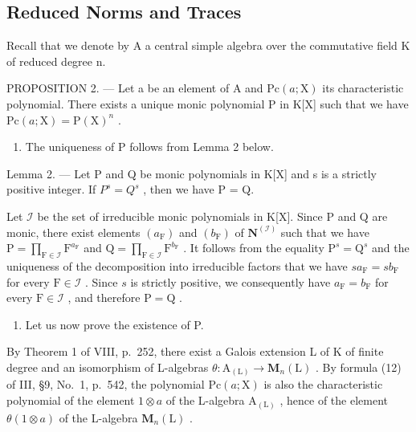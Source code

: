 \subsection{Reduced Norms and Traces}

Recall that we denote by A a central simple algebra over the commutative field K of reduced degree n.

PROPOSITION 2. --- Let a be an element of A and \(\mathrm{Pc}(a;\mathrm{X})\) its characteristic polynomial. There exists a unique monic polynomial P in K{[}X{]} such that we have \(\mathrm{Pc}(a;\mathrm{X})=\mathrm{P}(\mathrm{X})^{n}\) .

\begin{enumerate}
\def\labelenumi{\Alph{enumi})}
\tightlist
\item
  The uniqueness of P follows from Lemma 2 below.
\end{enumerate}

Lemma 2. --- Let P and Q be monic polynomials in K{[}X{]} and s is a strictly positive integer. If \(P^{s} = Q^{s}\) , then we have P = Q.

Let \(\mathcal{I}\) be the set of irreducible monic polynomials in K{[}X{]}. Since P and Q are monic, there exist elements \((a_{\mathrm{F}})\) and \((b_{\mathrm{F}})\) of \(\mathbf{N}^{(\mathcal{I})}\) such that we have \(\mathrm{P} = \prod_{\mathrm{F} \in \mathcal{I}} \mathrm{F}^{a_{\mathrm{F}}}\) and \(\mathrm{Q} = \prod_{\mathrm{F} \in \mathcal{I}} \mathrm{F}^{b_{\mathrm{F}}}\) . It follows from the equality \(\mathrm{P}^s = \mathrm{Q}^s\) and the uniqueness of the decomposition into irreducible factors that we have \(sa_{\mathrm{F}} = sb_{\mathrm{F}}\) for every \(\mathrm{F} \in \mathcal{I}\) . Since \(s\) is strictly positive, we consequently have \(a_{\mathrm{F}} = b_{\mathrm{F}}\) for every \(\mathrm{F} \in \mathcal{I}\) , and therefore \(\mathrm{P} = \mathrm{Q}\) .

\begin{enumerate}
\def\labelenumi{\Alph{enumi})}
\setcounter{enumi}{1}
\tightlist
\item
  Let us now prove the existence of P.
\end{enumerate}

By Theorem 1 of VIII, p.~252, there exist a Galois extension L of K of finite degree and an isomorphism of L-algebras \(\theta : \mathrm{A}_{(\mathrm{L})} \to \mathbf{M}_n(\mathrm{L})\) . By formula (12) of III, §9, No.~1, p.~542, the polynomial \(\mathrm{Pc}(a; \mathrm{X})\) is also the characteristic polynomial of the element \(1 \otimes a\) of the L-algebra \(\mathrm{A}_{(\mathrm{L})}\) , hence of the element \(\theta(1 \otimes a)\) of the L-algebra \(\mathbf{M}_n(\mathrm{L})\) .

